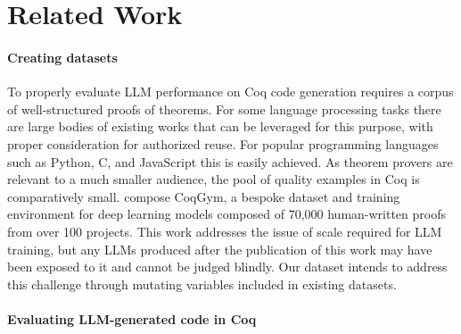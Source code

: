 
\section{Related Work}
\label{sec:related-work}


\paragraph{Creating datasets}
To properly evaluate LLM performance on
Coq code generation requires a corpus of well-structured
proofs of theorems. For some language processing tasks
there are large bodies of existing works that can be leveraged for this purpose, 
with proper consideration for authorized reuse.
For popular programming
languages such as Python, C, and JavaScript this is easily achieved.
As theorem provers are relevant to a much smaller audience, the pool of quality examples in Coq is
comparatively small.
\citet{learningtoprove} compose CoqGym,
a bespoke dataset and training environment for deep learning models
composed of 70,000 human-written proofs from over 100 projects.
This work addresses the issue of scale required for LLM training,
but any LLMs produced
after the publication of this work
may have been exposed to it and cannot be judged blindly.
Our dataset intends to address this challenge
through mutating variables included
in existing datasets.

\paragraph{Evaluating LLM-generated code in Coq}

